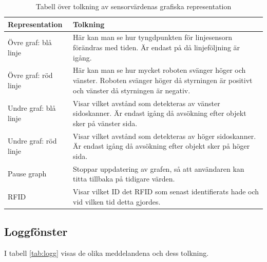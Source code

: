 \documentclass[a4paper,12pt]{article}
\begin{document}
\begin{table}[H]
    \centering
    \begin{tabularx}{\textwidth}{|l|X|}
        \hline \textbf{Representation} & \textbf{Tolkning} \\ \hline
        Övre graf: blå linje & Här kan man se hur tyngdpunkten för linjesensorn förändras med tiden. Är endast på då linjeföljning är igång.\\ \hline
        Övre graf: röd linje & Här kan man se hur mycket roboten svänger höger och vänster. Roboten svänger höger då styrningen är positivt och vänster då styrningen är negativ.\\ \hline
        Undre graf: blå linje & Visar vilket avstånd som detekteras av vänster sidoskanner. Är endast igång då avsökning efter objekt sker på vänster sida. \\ \hline
        Undre graf: röd linje & Visar vilket avstånd som detekteras av höger sidoskanner. Är endast igång då avsökning efter objekt sker på höger sida. \\ \hline
        Pause graph & Stoppar uppdatering av grafen, så att användaren kan titta tillbaka på tidigare värden.\\ \hline
        RFID & Visar vilket ID det RFID som senast identifierats hade och vid vilken tid detta gjordes. \\ \hline
    \end{tabularx}
\caption{Tabell över tolkning av sensorvärdenas grafiska representation}
\label{tab:sensor}
\end{table}

\subsection{Loggfönster}
\label{subsec:logg}
I tabell \ref{tab:logg} visas de olika meddelandena och dess tolkning.
\end{document}
